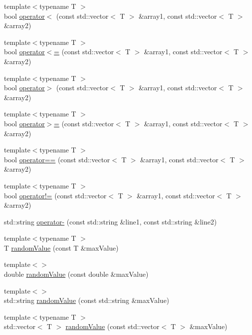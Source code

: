 \begin{DoxyCompactItemize}
\item 
{\footnotesize template$<$typename T $>$ }\\bool \mbox{\hyperlink{namespaceofo_a3a9f0e591617562dc29964c77510abf1}{operator$<$}} (const std\+::vector$<$ T $>$ \&array1, const std\+::vector$<$ T $>$ \&array2)
\item 
{\footnotesize template$<$typename T $>$ }\\bool \mbox{\hyperlink{namespaceofo_a248e627fce31919f3453b83efddaf1ab}{operator$<$=}} (const std\+::vector$<$ T $>$ \&array1, const std\+::vector$<$ T $>$ \&array2)
\item 
{\footnotesize template$<$typename T $>$ }\\bool \mbox{\hyperlink{namespaceofo_a5721f395418c99bbb91789f73f6fe7e4}{operator$>$}} (const std\+::vector$<$ T $>$ \&array1, const std\+::vector$<$ T $>$ \&array2)
\item 
{\footnotesize template$<$typename T $>$ }\\bool \mbox{\hyperlink{namespaceofo_aeff44072bd4fb8ed491c94e7eb4c2059}{operator$>$=}} (const std\+::vector$<$ T $>$ \&array1, const std\+::vector$<$ T $>$ \&array2)
\item 
{\footnotesize template$<$typename T $>$ }\\bool \mbox{\hyperlink{namespaceofo_ac9b79c838072eb36ce92e234b0b4dc81}{operator==}} (const std\+::vector$<$ T $>$ \&array1, const std\+::vector$<$ T $>$ \&array2)
\item 
{\footnotesize template$<$typename T $>$ }\\bool \mbox{\hyperlink{namespaceofo_a9746f36ff374ab6299fb0f990e0e0e83}{operator!=}} (const std\+::vector$<$ T $>$ \&array1, const std\+::vector$<$ T $>$ \&array2)
\item 
std\+::string \mbox{\hyperlink{namespaceofo_ab410ed9a84e65ca88a937b56b8411a97}{operator-\/}} (const std\+::string \&line1, const std\+::string \&line2)
\item 
{\footnotesize template$<$typename T $>$ }\\T \mbox{\hyperlink{namespaceofo_afe5c86df101d1623b1aea71e3ba7b0a9}{random\+Value}} (const T \&max\+Value)
\item 
{\footnotesize template$<$$>$ }\\double \mbox{\hyperlink{namespaceofo_a159780949b5de21d2d8358df8abc0ce2}{random\+Value}} (const double \&max\+Value)
\item 
{\footnotesize template$<$$>$ }\\std\+::string \mbox{\hyperlink{namespaceofo_ab6b4775595276351b6c5485fa99649b3}{random\+Value}} (const std\+::string \&max\+Value)
\item 
{\footnotesize template$<$typename T $>$ }\\std\+::vector$<$ T $>$ \mbox{\hyperlink{namespaceofo_aeded67ad2a0018cf9fb55c1697c4ae87}{random\+Value}} (const std\+::vector$<$ T $>$ \&max\+Value)
\end{DoxyCompactItemize}


